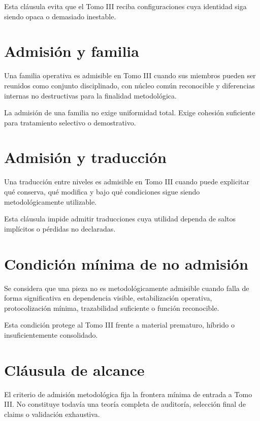 \begin{observation}
Esta cláusula evita que el Tomo III reciba configuraciones cuya identidad siga siendo opaca o demasiado inestable.
\end{observation}

\section{Admisión y familia}
\begin{definition}
Una familia operativa es admisible en Tomo III cuando sus miembros pueden ser reunidos como conjunto disciplinado, con núcleo común reconocible y diferencias internas no destructivas para la finalidad metodológica.
\end{definition}

\begin{observation}
La admisión de una familia no exige uniformidad total. Exige cohesión suficiente para tratamiento selectivo o demostrativo.
\end{observation}

\section{Admisión y traducción}
\begin{definition}
Una traducción entre niveles es admisible en Tomo III cuando puede explicitar qué conserva, qué modifica y bajo qué condiciones sigue siendo metodológicamente utilizable.
\end{definition}

\begin{observation}
Esta cláusula impide admitir traducciones cuya utilidad dependa de saltos implícitos o pérdidas no declaradas.
\end{observation}

\section{Condición mínima de no admisión}
\begin{definition}
Se considera que una pieza no es metodológicamente admisible cuando falla de forma significativa en dependencia visible, estabilización operativa, protocolización mínima, trazabilidad suficiente o función reconocible.
\end{definition}

\begin{observation}
Esta condición protege al Tomo III frente a material prematuro, híbrido o insuficientemente consolidado.
\end{observation}

\section{Cláusula de alcance}
\begin{observation}
El criterio de admisión metodológica fija la frontera mínima de entrada a Tomo III. No constituye todavía una teoría completa de auditoría, selección final de claims o validación exhaustiva.
\end{observation}

